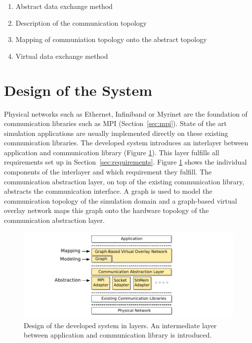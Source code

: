\begin{enumerate}
\item Abstract data exchange method
\item Description of the communication topology
\item Mapping of communiation topology onto the abstract topology
\item Virtual data exchange method 
\end{enumerate}



\section{Design of the System}

Physical networks such as Ethernet, Infiniband or Myrinet are the
foundation of communication libraries such as MPI
(Section~\ref{sec:mpi}).  State of the art simulation applications are
usually implemented directly on these existing communication
libraries. The developed system introduces an interlayer between
application and communication library (Figure \ref{fig:design}). This
layer fulfills all requirements set up in
Section~\ref{sec:requirements}. Figure \ref{fig:design} shows the
individual components of the interlayer and which requirement they
fulfill. The communication abstraction layer, on top of the existing
communication library, abstracts the communication interface.  A graph
is used to model the communication topology of the simulation domain
and a graph-based virtual overlay network maps this graph onto the
hardware topology of the communication abstraction layer.

\begin{figure}[H]
  \centering \includegraphics[width=\textwidth]{graphics/30_design}
  \caption{Design of the developed system in layers. An intermediate
  layer between application and communication library is introduced.}
  \label{fig:design}
\end{figure}


